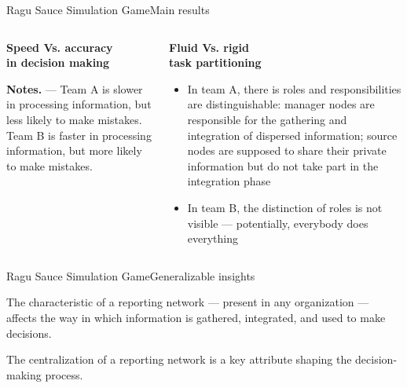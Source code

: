 \documentclass[notes, aspectratio=1610]{beamer}
\begin{document}
\begin{frame}{Ragu Sauce Simulation Game}{Main results}
	\begin{columns}[t]
		\begin{column}{0.5\textwidth}
			\begin{center}
				\textbf{Speed Vs. accuracy \\in decision making}

				

			\end{center}

			\scriptsize \textbf{Notes.} --- Team A is slower in 
			processing information, but less likely to make mistakes. 
			Team B is faster in processing information, but more 
			likely to make mistakes.
		\end{column}
		\begin{column}{0.5\textwidth}
			\begin{center}
				\textbf{Fluid Vs. rigid \\task partitioning}

				\begin{itemize}
					\item In team A, there is roles and 
					responsibilities are distinguishable:
					manager nodes are responsible for the 
					gathering and integration of dispersed 
					information; source nodes are 
					supposed to share their private information 
					but do not take part in the integration phase
					\item In team B, the distinction of roles 
					is not visible --- potentially, everybody 
					does everything
				\end{itemize}
			\end{center}
		\end{column}
	\end{columns}
\end{frame}

\begin{frame}{Ragu Sauce Simulation Game}{Generalizable insights}
	\begin{tcolorbox}[
		colback=tri_1!5!white,
		colframe=tri_1!90!black,
		title={\centering \small Proposition 3}]
		The characteristic of a reporting network --- present in any 
		organization --- affects the way in which information is 
		gathered, integrated, and used to make decisions.
	\end{tcolorbox}

	\pause

	\begin{tcolorbox}[
		colback=tri_2!5!white,
		colframe=tri_2!90!black,
		title={\centering \small Corollario to Proposition 3}]
		The centralization of a reporting network is a key attribute 
		shaping the decision-making process.
	\end{tcolorbox}
\end{frame}
\end{document}
